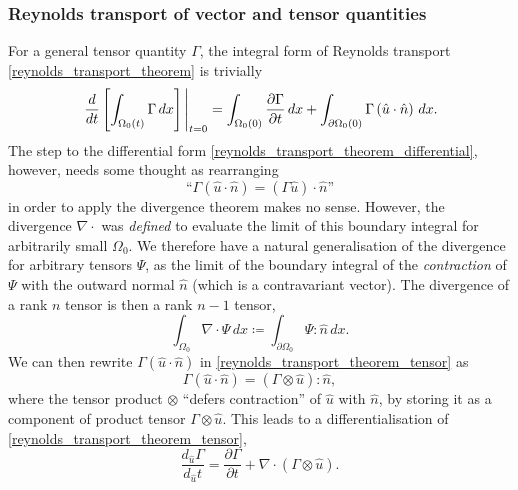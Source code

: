 \documentclass[11pt,a4paper]{memoir}
\newcommand{\Part}[2]{\frac{\partial #1}{\partial #2}}
\begin{document}
\subsubsection{Reynolds transport of vector and tensor quantities}
For a general tensor quantity $\Gamma$, the integral form of Reynolds transport \eqref{reynolds_transport_theorem} is trivially
\begin{equation}\label{reynolds_transport_theorem_tensor}
    \eval{\frac{d}{dt}\left[\int_{\Omega_0(t)}\Gamma\,dx\right]}_{t=0} =
        \int_{\Omega_0(0)}\Part{\Gamma}{t}\,dx + \int_{\partial\Omega_0(0)}\Gamma \left(\hat{u}\cdot\hat{n}\right) \,dx.
\end{equation}
The step to the differential form \eqref{reynolds_transport_theorem_differential}, however, needs some thought
as rearranging
    $$\text{``}\Gamma\left(\hat{u}\cdot \hat{n}\right) = (\Gamma\hat{u})\cdot \hat{n}\text{''}$$
in order to apply the divergence theorem makes no sense. However, the divergence $\nabla \cdot$ was \textit{defined}
to evaluate the limit of this boundary integral for arbitrarily small $\Omega_0$. We therefore have a natural generalisation of the
divergence for arbitrary tensors $\Psi$, as the limit of the boundary integral of the \textit{contraction} of $\Psi$ with the outward normal
$\hat{n}$ (which is a contravariant vector). The divergence of a rank $n$ tensor is then a rank $n-1$ tensor,
\begin{equation}\label{tensor_divergence}
    \int_{\Omega_0} \nabla\cdot\Psi\,dx \coloneqq
        \int_{\partial{\Omega_0}} \Psi : \hat{n}\,dx.
\end{equation}
We can then rewrite $\Gamma \left(\hat{u}\cdot \hat{n}\right)$ in \eqref{reynolds_transport_theorem_tensor} as
    $$\Gamma \left(\hat{u}\cdot \hat{n}\right) = \left(\Gamma \otimes \hat{u}\right) : \hat{n},$$
where the tensor product $\otimes$ ``defers contraction'' of $\hat{u}$ with $\hat{n}$, by storing it as a component of product tensor $\Gamma \otimes \hat{u}$.
This leads to a differentialisation of \eqref{reynolds_transport_theorem_tensor},
\begin{equation}\label{reynolds_transport_theorem_tensor_differential}
    \frac{d_{\hat{u}}\Gamma}{d_{\hat{u}}t} = \Part{\Gamma}{t} + \nabla \cdot(\Gamma \otimes \hat{u}).
\end{equation}
\end{document}
